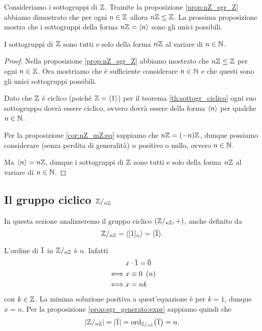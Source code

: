 Consideriamo i sottogruppi di $\mathbb{Z}$. Tramite la proposizione \ref{prop:nZ_sgr_Z} abbiamo dimostrato che per ogni $n \in \mathbb{Z}$ allora $n\mathbb{Z} \leq \mathbb{Z}$. La prossima proposizione mostra che i sottogruppi della forma $n\mathbb{Z} = \langle n\rangle$ sono gli unici possibili.

\begin{proposition}
    \label{prop:sgr_Z}
    I sottogruppi di $\mathbb{Z}$ sono tutti e solo della forma $n\mathbb{Z}$ al variare di $n \in \mathbb{N}$.
\end{proposition}
\begin{proof}
    Nella proposizione \ref{prop:nZ_sgr_Z} abbiamo mostrato che $n\mathbb{Z} \leq \mathbb{Z}$ per ogni $n \in \mathbb{Z}$. Ora mostriamo che è sufficiente considerare $n \in \mathbb{N}$ e che questi sono gli unici sottogruppi possibili.

    Dato che $\mathbb{Z}$ è ciclico (poiché $\mathbb{Z} = \langle1\rangle$) per il teorema \ref{th:sottogr_ciclico} ogni suo sottogruppo dovrà essere ciclico, ovvero dovrà essere della forma $\langle n\rangle$ per qualche $n \in \mathbb{N}$.

    Per la proposizione \ref{cor:nZ_mZ:eq} sappiamo che $n\mathbb{Z} = (-n)\mathbb{Z}$, dunque possiamo considerare (senza perdita di generalità) $n$ positivo o nullo, ovvero $n \in \mathbb{N}$.

    Ma $\langle n\rangle = n\mathbb{Z}$, dunque i sottogruppi di $\mathbb{Z}$ sono tutti e solo della forma $n\mathbb{Z}$ al variare di $n \in \mathbb{N}$.
\end{proof}


\subsection{Il gruppo ciclico $\mathbb{Z}/_{n\mathbb{Z}}$}

In questa sezione analizzeremo il gruppo ciclico $(\mathbb{Z}/_{n\mathbb{Z}}, +)$, anche definito da \[
    \Zmod{n} = \gen{[1]_n} = \gen{\eqcl 1}.
\]

L'ordine di $\eqcl 1$ in $\mathbb{Z}/_{n\mathbb{Z}}$ è $n$. Infatti \begin{align*}
    &x\cdot \eqcl 1 = \eqcl 0\\
    \iff &x \congr 0 \Mod n \\
    \iff &x = nk
\end{align*}
con $k \in \mathbb{Z}$. 
La minima soluzione positiva a quest'equazione è per $k = 1$, dunque $x = n$. 
Per la proposizione \ref{prop:sgr_generato:expr} sappiamo quindi che \begin{equation} \label{eq:card_Z/nZ}
    \abs{\Zmod{n}} = \abs{\eqcl 1} = \ord[\Zmod{n}]{\eqcl 1} = n.
\end{equation}

